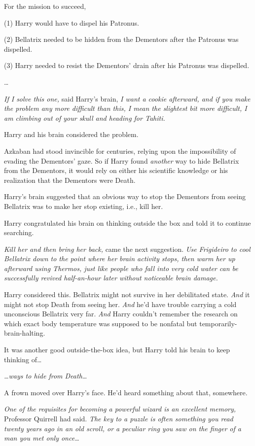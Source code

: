 For the mission to succeed,

(1) Harry would have to dispel his Patronus.

(2) Bellatrix needed to be hidden from the Dementors after the Patronus was 
dispelled.

(3) Harry needed to resist the Dementors' drain after his Patronus was 
dispelled.

{\ldots}

\emph{If I solve this one,} said Harry's brain, \emph{I want a cookie 
afterward, and if you make the problem any more difficult than this, I mean the 
slightest bit more difficult, I am climbing out of your skull and heading for 
Tahiti.}

Harry and his brain considered the problem.

Azkaban had stood invincible for centuries, relying upon the impossibility of 
evading the Dementors' gaze. So if Harry found \emph{another} way to hide 
Bellatrix from the Dementors, it would rely on either his scientific knowledge 
or his realization that the Dementors were Death.

Harry's brain suggested that an obvious way to stop the Dementors from seeing 
Bellatrix was to make her stop existing, i.e., kill her.

Harry congratulated his brain on thinking outside the box and told it to 
continue searching.

\emph{Kill her and then bring her back,} came the next suggestion. \emph{Use 
Frigideiro to cool Bellatrix down to the point where her brain activity stops, 
then warm her up afterward using Thermos, just like people who fall into very 
cold water can be successfully revived half-an-hour later without noticeable 
brain damage.}

Harry considered this. Bellatrix might not survive in her debilitated state. 
\emph{And} it might not stop Death from seeing her. \emph{And} he'd have 
trouble carrying a cold unconscious Bellatrix very far. \emph{And} Harry 
couldn't remember the research on which exact body temperature was supposed to 
be nonfatal but temporarily-brain-halting.

It was another good outside-the-box idea, but Harry told his brain to keep 
thinking of{\ldots}

\emph{{\ldots}ways to hide from Death{\ldots}}

A frown moved over Harry's face. He'd heard something about that, somewhere.

\emph{One of the requisites for becoming a powerful wizard is an excellent 
memory,} Professor Quirrell had said.\emph{ The key to a puzzle is often 
something you read twenty years ago in an old scroll, or a peculiar ring you 
saw on the finger of a man you met only once{\ldots}}

